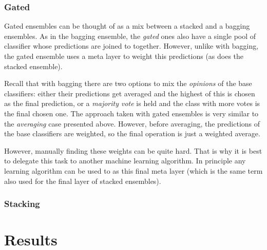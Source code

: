 \documentclass[epsfig,a4paper,11pt,titlepage,twoside,openany]{book}
\begin{document}
\cite{Breiman1996_bagging_predictors}


\subsection{Gated}
\label{sec:ens-gated}

Gated ensembles can be thought of as a mix between a stacked and a bagging ensembles. As in the bagging ensemble, the \textit{gated} ones also have a single pool of classifier whose predictions are joined to together. However, unlike with bagging, the gated ensemble uses a meta layer to weight this predictions (as does the stacked ensemble).

Recall that with bagging there are two options to mix the \textit{opinions} of the base classifiers: either their predictions get averaged and the highest of this is chosen as the final prediction, or a \textit{majority vote} is held and the class with more votes is the final chosen one. The approach taken with gated ensembles is very similar to the \textit{averaging} case presented above. However, before averaging, the predictions of the base classifiers are weighted, so the final operation is just a weighted average.

However, manually finding these weights can be quite hard. That is why it is best to delegate this task to another machine learning algorithm. In principle any learning algorithm can be used to as this final meta layer (which is the same term also used for the final layer of stacked ensembles). 



\subsection{Stacking}
\label{sec:ens-stacking}



\chapter{Results}
\label{chap:results}
\end{document}
